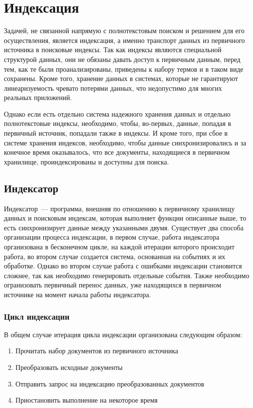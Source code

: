 \section{Индексация}

Задачей, не связанной напрямую с полнотекстовым поиском и решением для его осуществления, является индексация, а именно транспорт данных из первичного источника в поисковые индексы. Так как индексы являются специальной структурой данных, они не обязаны давать доступ к первичным данным, перед тем, как те были проанализированы, приведены к набору термов и в таком виде сохранены. Кроме того, хранение данных в системах, которые не гарантируют линеаризуемость чревато потерями данных, что недопустимо для многих реальных приложений.

Однако если есть отдельно система надежного хранения данных и отдельно полнотекстовые индексы, необходимо, чтобы, во-первых, данные, попадая в первичный источник, попадали также в индексы. И кроме того, при сбое в системе хранения индексов, необходимо, чтобы данные синхронизировались и за конечное время оказывалось, что все документы, находящиеся в первичном хранилище, проиндексированы и доступны для поиска.

\subsection{Индексатор}

Индексатор~--- программа, внешняя по отношению к первичному хранилищу данных и поисковым индексам, которая выполняет функции описанные выше, то есть синхронизирует данные между указанными двумя. Существует два способа организации процесса индексации, в первом случае, работа индексатора организована в бесконечном цикле, на каждой итерации которого происходит работа, во втором случае создается система, основанная на событиях и их обработке. Однако во втором случае работа с ошибками индексации становится сложнее, так как необходимо генерировать отдельные события. Также необходимо огранизовать первичный перенос данных, уже находящихся в первичном источнике на момент начала работы индексатора.

\subsubsection{Цикл индексации}

В общем случае итерация цикла индексации организована следующим образом:

\begin{enumerate}
	\item Прочитать набор документов из первичного источника
	\item Преобразовать исходные документы
	\item Отправить запрос на индексацию преобразованных документов
	\item Приостановить выполнение на некоторое время
\end{enumerate}


